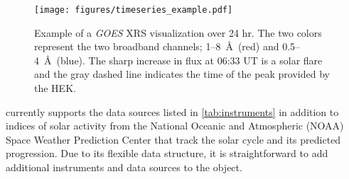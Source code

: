 \begin{figure}
    \centering
    \texttt{[image: figures/timeseries\_example.pdf]}
    \caption{Example of a \textit{GOES} XRS \Timeseries visualization over 24 hr. The two colors represent the two broadband channels; 1--8~\AA\ (red) and 0.5--4~\AA\ (blue).
            The sharp increase in flux at 06:33 UT is a solar flare and the gray dashed line indicates the time of the peak provided by the HEK.}
    \label{fig:timeseries_example}
\end{figure}

\Timeseries currently supports the data sources listed in \autoref{tab:instruments} in addition to indices of solar activity from the National Oceanic and Atmospheric (NOAA) Space Weather Prediction Center that track the solar cycle and its predicted progression. Due to its flexible data structure, it is straightforward to add additional instruments and data sources to the \Timeseries object.

